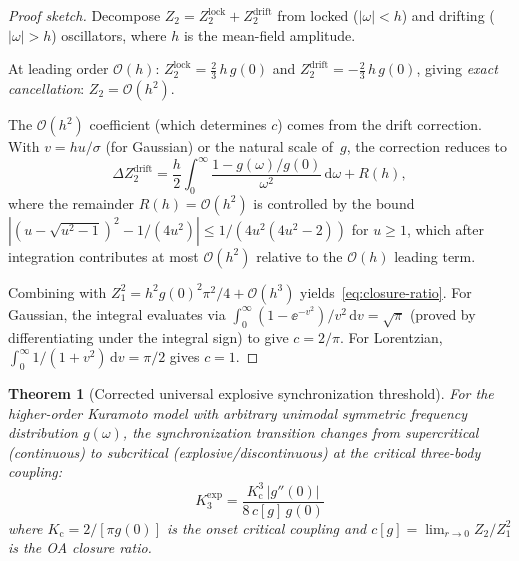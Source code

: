 \documentclass[11pt]{article}
\newcommand{\dd}{\mathrm{d}}
\newcommand{\Kc}{K_{\mathrm{c}}}
\newtheorem{theorem}{Theorem}
\begin{document}
\begin{proof}[Proof sketch]
  Decompose $Z_2 = Z_2^{\mathrm{lock}} + Z_2^{\mathrm{drift}}$ from
  locked ($|\omega| < h$) and drifting ($|\omega| > h$) oscillators,
  where $h$ is the mean-field amplitude.

  At leading order $\mathcal{O}(h)$:
  $Z_2^{\mathrm{lock}} = \tfrac{2}{3}\,h\,g(0)$ and
  $Z_2^{\mathrm{drift}} = -\tfrac{2}{3}\,h\,g(0)$,
  giving \emph{exact cancellation}: $Z_2 = \mathcal{O}(h^2)$.

  The $\mathcal{O}(h^2)$ coefficient (which determines $c$) comes from
  the drift correction.  With $v = hu/\sigma$ (for Gaussian) or the
  natural scale of~$g$, the correction reduces to
  \[
    \Delta Z_2^{\mathrm{drift}}
    = \frac{h}{2}\int_0^\infty
      \frac{1 - g(\omega)/g(0)}{\omega^2}\,\dd\omega + R(h),
  \]
  where the remainder $R(h) = \mathcal{O}(h^2)$ is controlled by the
  bound $|(u-\sqrt{u^2-1})^2 - 1/(4u^2)| \le 1/(4u^2(4u^2-2))$ for
  $u\ge 1$, which after integration contributes at most
  $\mathcal{O}(h^2)$ relative to the $\mathcal{O}(h)$ leading term.

  Combining with $Z_1^2 = h^2 g(0)^2\pi^2/4 + \mathcal{O}(h^3)$
  yields~\eqref{eq:closure-ratio}.  For Gaussian, the integral
  evaluates via $\int_0^\infty(1-\ee^{-v^2})/v^2\,\dd v = \sqrt\pi$
  (proved by differentiating under the integral sign) to give
  $c = 2/\pi$.  For Lorentzian, $\int_0^\infty 1/(1+v^2)\,\dd v
  = \pi/2$ gives $c=1$.
\end{proof}

\begin{theorem}[Corrected universal explosive synchronization threshold]
\label{thm:universal-explosive}
  For the higher-order Kuramoto model with arbitrary unimodal symmetric
  frequency distribution $g(\omega)$, the synchronization transition changes
  from supercritical (continuous) to subcritical (explosive/discontinuous)
  at the critical three-body coupling:
  \begin{equation}
    \boxed{
    K_3^{\mathrm{exp}} = \frac{\Kc^3\,|g''(0)|}{8\,c[g]\,g(0)}
    }
    \label{eq:K3-explosive-corrected}
  \end{equation}
  where $\Kc = 2/[\pi g(0)]$ is the onset critical coupling and
  $c[g] = \lim_{r\to 0} Z_2/Z_1^2$ is the OA closure ratio.
\end{theorem}
\end{document}
